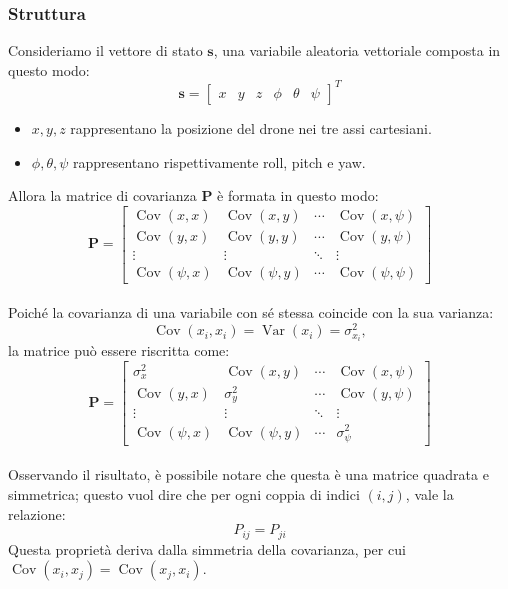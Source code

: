 \subsubsection{Struttura}
Consideriamo il vettore di stato $\mathbf{s}$, una variabile aleatoria vettoriale composta in questo modo:
\[
\mathbf{s} =
\begin{bmatrix}
	x & y & z & \phi & \theta & \psi
\end{bmatrix}^{T}
\]
\begin{itemize}
	\item \(x,y,z\) rappresentano la posizione del drone nei tre assi cartesiani.
	\item\(\phi, \theta, \psi\) rappresentano rispettivamente roll, pitch e yaw.
\end{itemize}
Allora la matrice di covarianza $\mathbf{P}$ è formata in questo modo:
\[
\mathbf{P} =
\begin{bmatrix}
	\operatorname{Cov}(x,x) & \operatorname{Cov}(x,y) & \cdots & \operatorname{Cov}(x,\psi)\\
	\operatorname{Cov}(y,x) & \operatorname{Cov}(y,y) & \cdots & \operatorname{Cov}(y,\psi)\\
	\vdots & \vdots & \ddots & \vdots\\
	\operatorname{Cov}(\psi,x) & \operatorname{Cov}(\psi,y) & \cdots & \operatorname{Cov}(\psi,\psi)
\end{bmatrix}
\]
\\
Poiché la covarianza di una variabile con sé stessa coincide con la sua varianza:
\[
\operatorname{Cov}(x_i,x_i)
=\operatorname{Var}(x_i)
=\sigma_{x_i}^{2},
\]
la matrice può essere riscritta come:
\[
\mathbf{P} =
\begin{bmatrix}
	\sigma_x^2 & \operatorname{Cov}(x,y) & \cdots & \operatorname{Cov}(x,\psi) \\
	\operatorname{Cov}(y,x) & \sigma_y^2 & \cdots & \operatorname{Cov}(y,\psi) \\
	\vdots & \vdots & \ddots & \vdots \\
	\operatorname{Cov}(\psi,x) & \operatorname{Cov}(\psi,y) & \cdots & \sigma_\psi^2
\end{bmatrix}
\]
\\
Osservando il risultato, è possibile notare che questa è una matrice quadrata e simmetrica; questo vuol dire che per ogni coppia di indici $(i,j)$, vale la relazione:
\[
P_{ij}=P_{ji}
\]
Questa proprietà deriva dalla simmetria della covarianza, per cui $\operatorname{Cov}(x_i,x_j)=\operatorname{Cov}(x_j,x_i)$.
